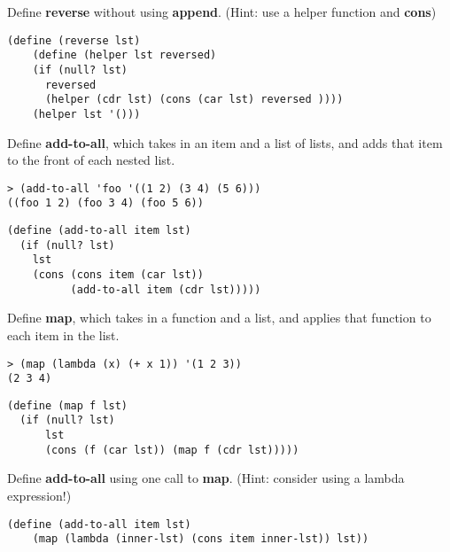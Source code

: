 \question
Define \textbf{reverse} without using \textbf{append}. (Hint: use a helper function and \textbf{cons})

\begin{solution}[0.5in]
\begin{verbatim}
(define (reverse lst)
    (define (helper lst reversed)
    (if (null? lst)
      reversed
      (helper (cdr lst) (cons (car lst) reversed ))))
    (helper lst '()))
\end{verbatim}
\end{solution}

\question
Define \textbf{add-to-all}, which takes in an item and a list of lists, and adds that item to the front of each nested list.

\begin{lstlisting}
> (add-to-all 'foo '((1 2) (3 4) (5 6)))
((foo 1 2) (foo 3 4) (foo 5 6))
\end{lstlisting}

\begin{solution}[0.5in]
\begin{verbatim}
(define (add-to-all item lst)
  (if (null? lst)
    lst
    (cons (cons item (car lst))
          (add-to-all item (cdr lst)))))
\end{verbatim}
\end{solution}

\question
Define \textbf{map}, which takes in a function and a list, and applies that function to each item in the list.

\begin{lstlisting}
> (map (lambda (x) (+ x 1)) '(1 2 3))
(2 3 4)
\end{lstlisting}

\begin{solution}[0.5in]
\begin{verbatim}
(define (map f lst)
  (if (null? lst)
      lst
      (cons (f (car lst)) (map f (cdr lst)))))
\end{verbatim}
\end{solution}

\question
Define \textbf{add-to-all} using one call to \textbf{map}. (Hint: consider using a lambda expression!)

\begin{solution}[0.25in]
\begin{verbatim}
(define (add-to-all item lst)
    (map (lambda (inner-lst) (cons item inner-lst)) lst))
\end{verbatim}
\end{solution}

